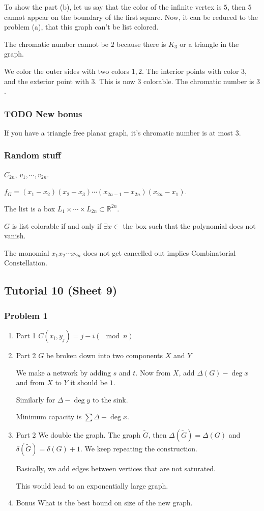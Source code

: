 \documentclass[11pt]{article}
\def\R{\mathbb{R}}
\begin{document}
To show the part (b), let us say that the color of the infinite vertex is
\(5\), then \(5\) cannot appear on the boundary of the first square. Now, it can
be reduced to the problem (a), that this graph can't be list colored.

The chromatic number cannot be \(2\) because there is \(K_3\) or a triangle in
the graph.

We color the outer sides with two colors \(1, 2\). The interior points with
color \(3\), and the exterior point with \(3\). This is now \(3\) colorable. The
chromatic number is \(3\).
\subsubsection{{\bfseries\sffamily TODO} New bonus}
\label{sec:orgab56166}
If you have a triangle free planar graph, it's chromatic number is at most \(3\).
\subsubsection{Random stuff}
\label{sec:org7f13ce6}
\(C_{2n}\), \(v_1, \cdots, v_{2n}\).

\(f_G = (x_1 -x_2)(x_2 - x_3) \cdots (x_{2n-1} - x_{2n})(x_{2n} - x_1)\).

The list is a box \(L_1 \times \cdots \times L_{2n} \subset \R^{2n}\).

\(G\) is list colorable if and only if \(\exists x \in\) the box such that the
polynomial does not vanish.

The monomial \(x_1x_2\cdots x_{2n}\) does not get cancelled out implies
Combinatorial Constellation.
\subsection{Tutorial 10 (Sheet 9)}
\label{sec:orgff9d017}
\subsubsection{Problem 1}
\label{sec:org49192b4}
\begin{enumerate}
\item Part 1
\label{sec:org8e2c44e}
\(C(x_i, y_j) = j - i (\mod n)\)
\item Part 2
\label{sec:org8168860}
\(G\) be broken down into two components \(X\) and \(Y\)

We make a network by adding \(s\) and \(t\). Now from \(X\), add \(\Delta(G) -
     \deg x\) and from \(X\) to \(Y\) it should be \(1\).

Similarly for \(\Delta - \deg y\) to the sink.

Minimum capacity is \(\sum \Delta - \deg x\).
\item Part 2
\label{sec:org30fc343}
We double the graph. The graph \(\tilde{G}\), then \(\Delta(\tilde G) =
     \Delta(G)\) and \(\delta(\tilde{G}) = \delta(G) + 1\). We keep repeating the
construction.

Basically, we add edges between vertices that are not saturated.

This would lead to an exponentially large graph.
\item Bonus
\label{sec:orgcaab346}
What is the best bound on size of the new graph.
\end{enumerate}
\end{document}

